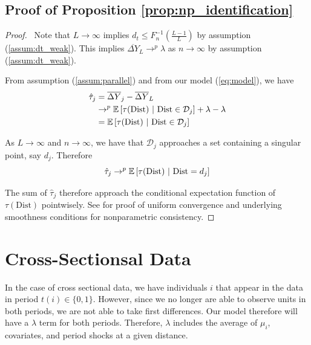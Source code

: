 \documentclass[10pt]{article}
\newcommand{\dist}{\text{Dist}}
\begin{document}
\subsection{Proof of Proposition \ref{prop:np_identification}}

\begin{proof}
    \ Note that $L \to \infty$ implies $d_t \leq F_n^{-1}(\frac{L-1}{L})$ by assumption (\ref{assum:dt_weak}). This implies $\overline{\Delta Y}_L \to^p \lambda$ as $n \to \infty$ by assumption (\ref{assum:dt_weak}). 
    
    From assumption (\ref{assum:parallel}) and from our model (\ref{eq:model}), we have
    \begin{align*}
        \hat{\tau}_j &= \overline{\Delta Y}_j - \overline{\Delta Y}_L \\
        &\to^p \condexpec{\tau(\dist)}{\dist \in \mathcal{D}_j} + \lambda - \lambda \\
        &= \condexpec{\tau(\dist)}{\dist \in \mathcal{D}_j}
    \end{align*}

    As $L \to \infty$ and $n \to \infty$, we have that $\mathcal{D}_j$ approaches a set containing a singular point, say $d_j$. Therefore 
    $$ 
        \hat{\tau}_j \to^p \condexpec{\tau(\dist)}{\dist = d_j}
    $$

    The sum of $\hat{\tau}_j$ therefore approach the conditional expectation function of $\tau(\dist)$ pointwisely. See \citet{Cattaneo_Farrell_Feng_2019} for proof of uniform convergence and underlying smoothness conditions for nonparametric consistency.
\end{proof}




\section{Cross-Sectionsal Data}

In the case of cross sectional data, we have individuals $i$ that appear in the data in period $t(i) \in \{0,1\}$. However, since we no longer are able to observe units in both periods, we are not able to take first differences. Our model therefore will have a $\lambda$ term for both periods. Therefore, $\lambda$ includes the average of $\mu_i$, covariates, and period shocks at a given distance.
\end{document}
